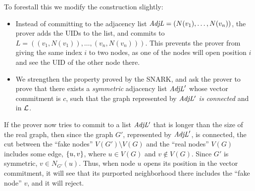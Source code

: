 To forestall this we modify the construction slightly:
\begin{itemize}
	\item Instead of committing to the adjacency list $\mathit{ AdjL } = (N(v_1),\ldots,N(v_n))$,
the prover adds the UIDs to the list, and commits to $L = ( (v_1, N(v_1)), \ldots, (v_n, N(v_n)))$.
This prevents the prover from giving the same index $i$ to two nodes, as one of the nodes will open 
position $i$ and see the UID of the other node there.
\item 
We strengthen the property proved by the SNARK,
and ask the prover to prove that there exists a \emph{symmetric} adjacency list $\mathit{ AdjL }'$
whose vector commitment is $c$,
such that the graph represented by $\mathit{ AdjL' }$ \emph{is connected} and in $\mathcal{L}$.
	\end{itemize}
%
If the prover now tries to commit to a list $\mathit{ AdjL' }$ that is longer than the size of the real graph, then since the graph $G'$, represented by $\mathit{ AdjL }'$, is connected, the cut between the ``fake nodes'' $V(G') \setminus V(G)$ and the ``real nodes'' $V(G)$ includes some edge, $\left \{{u,v} \right \}$, where $u \in V(G)$ and $v \not \in V(G)$. Since $G'$ is symmetric, $v \in N_{G'}(u)$. Thus, when node $u$ opens its position in the vector commitment, it will see that its purported neighborhood there includes the ``fake node'' $v$, and it will reject.

